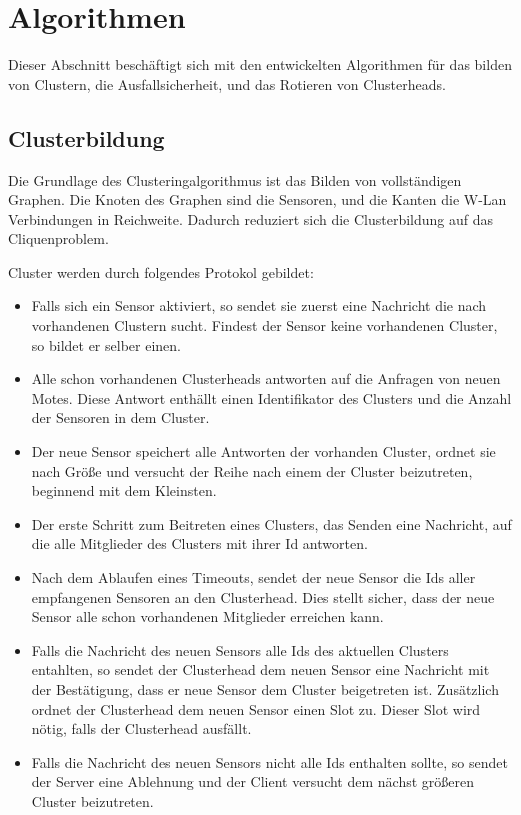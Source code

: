 \section{Algorithmen}
Dieser Abschnitt besch\"aftigt sich mit den entwickelten Algorithmen f\"ur das bilden von Clustern, die Ausfallsicherheit, und das Rotieren von Clusterheads.

\subsection{Clusterbildung}
Die Grundlage des Clusteringalgorithmus ist das Bilden von vollst\"andigen Graphen.
Die Knoten des Graphen sind die Sensoren, und die Kanten die W-Lan Verbindungen in Reichweite.
Dadurch reduziert sich die Clusterbildung auf das Cliquenproblem.

Cluster werden durch folgendes Protokol gebildet:
\begin{itemize}
\item Falls sich ein Sensor aktiviert, so sendet sie zuerst eine Nachricht die nach vorhandenen Clustern sucht. Findest der Sensor keine vorhandenen Cluster, so bildet er selber einen.
\item Alle schon vorhandenen Clusterheads antworten auf die Anfragen von neuen Motes. Diese Antwort enth\"allt einen Identifikator des Clusters und die Anzahl der Sensoren in dem Cluster.
\item Der neue Sensor speichert alle Antworten der vorhanden Cluster, ordnet sie nach Gr\"o\ss e und versucht der Reihe nach einem der Cluster beizutreten, beginnend mit dem Kleinsten.
\item Der erste Schritt zum Beitreten eines Clusters, das Senden eine Nachricht, auf die alle Mitglieder des Clusters mit ihrer Id antworten.
\item Nach dem Ablaufen eines Timeouts, sendet der neue Sensor die Ids aller empfangenen Sensoren an den Clusterhead. Dies stellt sicher, dass der neue Sensor alle schon vorhandenen Mitglieder erreichen kann.
\item Falls die Nachricht des neuen Sensors alle Ids des aktuellen Clusters entahlten, so sendet der Clusterhead dem neuen Sensor eine Nachricht mit der Best\"atigung, dass er neue Sensor dem Cluster beigetreten ist. Zus\"atzlich ordnet der Clusterhead dem neuen Sensor einen Slot zu. Dieser Slot wird n\"otig, falls der Clusterhead ausf\"allt.
\item Falls die Nachricht des neuen Sensors nicht alle Ids enthalten sollte, so sendet der Server eine Ablehnung und der Client versucht dem n\"achst gr\"o\ss eren Cluster beizutreten.
\end{itemize}

